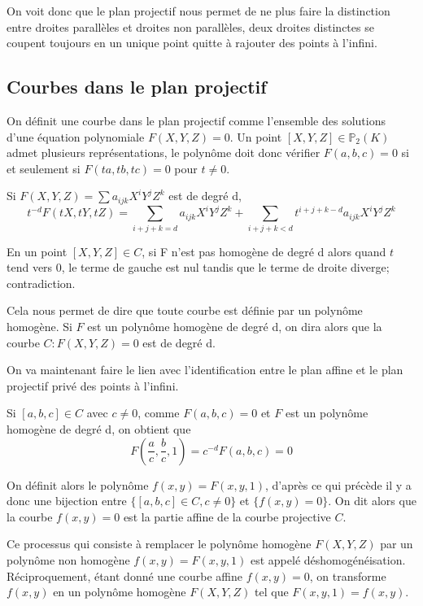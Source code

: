 \documentclass{article}
\begin{document}
On voit donc que le plan projectif nous permet de ne plus faire la distinction entre droites parallèles et droites non parallèles,
deux droites distinctes se coupent toujours en un unique point quitte à rajouter des points à l'infini.

\subsection{Courbes dans le plan projectif}
On définit une courbe dans le plan projectif comme l'ensemble des solutions d'une équation polynomiale $F(X,Y,Z)=0$.
Un point $[X, Y, Z]\in \mathbb{P}_{2}(K)$ admet plusieurs représentations, le polynôme doit donc vérifier
$F(a,b,c)=0$ si et seulement si $F(ta,tb,tc)=0$ pour $t\neq 0$.

Si $F(X,Y,Z)=\sum{a_{ijk}X^{i}Y^{j}Z^{k}}$ est de degré d, 
\begin{equation*}
t^{-d}F(tX, tY, tZ) = \sum_{i+j+k=d}{a_{ijk}X^{i}Y^{j}Z^{k}} + 
\sum_{i+j+k < d}{t^{i+j+k-d}a_{ijk}X^{i}Y^{j}Z^{k}}
\end{equation*}

En un point $[X,Y,Z] \in C$, si F n'est pas homogène de degré d alors quand $t$ tend vers 0, le terme de gauche 
est nul tandis que le terme de droite diverge; contradiction.

Cela nous permet de dire que toute courbe est définie par un polynôme homogène. Si $F$ est un polynôme
homogène de degré d, on dira alors que la courbe $C: F(X,Y,Z)=0$ est de degré d.

On va maintenant faire le lien avec l'identification entre le plan affine 
et le plan projectif privé des points à l'infini.

Si $[a,b,c]\in C$ avec $c\neq 0$, comme $F(a,b,c)=0$ et $F$ est un polynôme homogène de degré d, on obtient que
\begin{equation*}
F(\frac{a}{c}, \frac{b}{c}, 1)=c^{-d}F(a,b,c)=0
\end{equation*}

On définit alors le polynôme $f(x,y)=F(x,y,1)$, d'après ce qui précède il y a donc une bijection entre $\{[a,b,c]\in C, c\neq 0\}$ et $\{f(x,y)=0\}$.
On dit alors que la courbe $f(x,y)=0$ est la partie affine de la courbe projective $C$.

Ce processus qui consiste à remplacer le polynôme homogène $F(X,Y,Z)$ par un polynôme non homogène $f(x,y)=F(x,y,1)$ est appelé déshomogénéisation. Réciproquement, étant donné une courbe affine $f(x,y)=0$, on transforme $f(x,y)$ en un polynôme homogène $F(X,Y,Z)$ tel que
$F(x,y,1)=f(x,y)$.
\end{document}
